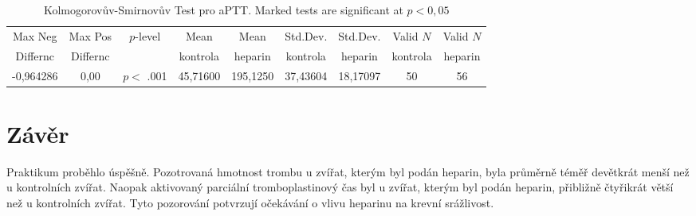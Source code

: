 \documentclass[12pt]{article}
\begin{document}
\begin{table}[h!]
\begin{tabular}{|c|c|c|c|c|c|c|c|c|}
\hline
Max Neg & Max Pos & $p$-level & Mean & Mean & Std.Dev. & Std.Dev. & Valid $N$ & Valid $N$ \\
Differnc & Differnc & & kontrola & heparin & kontrola & heparin & kontrola & heparin \\
\hline
-0,964286 & 0,00 & $p <$ .001 & 45,71600 & 195,1250 & 37,43604 & 18,17097 & 50 & 56 \\
\hline
\end{tabular}
\caption{Kolmogorovův-Smirnovův Test pro aPTT. Marked tests are significant at $p < 0,05$}
\end{table}

\clearpage

\section{Závěr}
Praktikum proběhlo úspěšně. Pozotrovaná hmotnost trombu u zvířat, kterým byl podán heparin, byla průměrně téměř devětkrát menší než u kontrolních zvířat. Naopak aktivovaný parciální tromboplastinový čas byl u zvířat, kterým byl podán heparin, přibližně čtyřikrát větší než u kontrolních zvířat. Tyto pozorování potvrzují očekávání o vlivu heparinu na krevní srážlivost.
\end{document}
